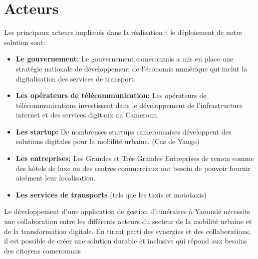 \section{Acteurs}
Les principaux acteurs impliaués dans la réalisation t le déploiement de notre solution sont:
\begin{itemize}
    \item \textbf{Le gouvernement:} Le gouvernement camerounais a mis en place une stratégie nationale de développement de l'économie numérique qui inclut la digitalisation des services de transport.
    \item \textbf{Les opérateurs de télécommunication:}  Les opérateurs de télécommunications investissent dans le développement de l'infrastructure internet et des services digitaux au Cameroun.
    \item \textbf{Les startup:} De nombreuses startups camerounaises développent des solutions digitales pour la mobilité urbaine. (Cas de Yango)
    \item \textbf{Les entreprises:} Les Grandes et Très Grandes Entreprises de renom comme des hôtels de luxe ou des centres commerciaux ont besoin de pouvoir fournir aisément leur localisation.
    \item  \textbf{Les services de transports} (tels que les taxis et mototaxis)
\end{itemize}

Le développement d'une application de gestion d'itinéraires à Yaoundé nécessite une collaboration entre les différents acteurs du secteur de la mobilité urbaine et de la transformation digitale. En tirant parti des synergies et des collaborations, il est possible de créer une solution durable et inclusive qui répond aux besoins des citoyens camerounais

